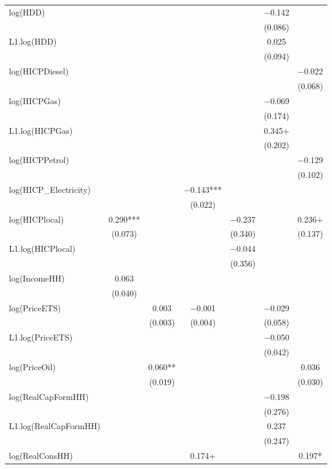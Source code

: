 \begin{table}
{\begin{tabular}[t]{lcccccc}
log(HDD) &  &  &  &  & \num{-0.142} & \\
 &  &  &  &  & (\num{0.086}) & \\
L1.log(HDD) &  &  &  &  & \num{0.025} & \\
 &  &  &  &  & (\num{0.094}) & \\
log(HICPDiesel) &  &  &  &  &  & \num{-0.022}\\
 &  &  &  &  &  & (\num{0.068})\\
log(HICPGas) &  &  &  &  & \num{-0.069} & \\
 &  &  &  &  & (\num{0.174}) & \\
L1.log(HICPGas) &  &  &  &  & \num{0.345}+ & \\
 &  &  &  &  & (\num{0.202}) & \\
log(HICPPetrol) &  &  &  &  &  & \num{-0.129}\\
 &  &  &  &  &  & (\num{0.102})\\
log(HICP\_Electricity) &  &  & \num{-0.143}*** &  &  & \\
 &  &  & (\num{0.022}) &  &  & \\
log(HICPlocal) & \num{0.290}*** &  &  & \num{-0.237} &  & \num{0.236}+\\
 & (\num{0.073}) &  &  & (\num{0.340}) &  & (\num{0.137})\\
L1.log(HICPlocal) &  &  &  & \num{-0.044} &  & \\
 &  &  &  & (\num{0.356}) &  & \\
log(IncomeHH) & \num{0.063} &  &  &  &  & \\
 & (\num{0.040}) &  &  &  &  & \\
log(PriceETS) &  & \num{0.003} & \num{-0.001} &  & \num{-0.029} & \\
 &  & (\num{0.003}) & (\num{0.004}) &  & (\num{0.058}) & \\
L1.log(PriceETS) &  &  &  &  & \num{-0.050} & \\
 &  &  &  &  & (\num{0.042}) & \\
log(PriceOil) &  & \num{0.060}** &  &  &  & \num{0.036}\\
 &  & (\num{0.019}) &  &  &  & (\num{0.030})\\
log(RealCapFormHH) &  &  &  &  & \num{-0.198} & \\
 &  &  &  &  & (\num{0.276}) & \\
L1.log(RealCapFormHH) &  &  &  &  & \num{0.237} & \\
 &  &  &  &  & (\num{0.247}) & \\
log(RealConsHH) &  &  & \num{0.174}+ &  &  & \num{0.197}*\\

\end{tabular}}
\end{table}
